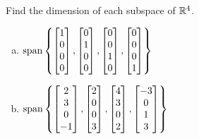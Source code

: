 \begin{applicationActivities}{3}{14}
\begin{activity}{15}
  Find the dimension of each subspace of \(\mathbb{R}^4\).
  \begin{multicols}{3}\small
  \begin{enumerate}[a)]
    \item \(\operatorname{span}\left\{
    \begin{bmatrix}1\\0\\0\\0\end{bmatrix},
    \begin{bmatrix}0\\1\\0\\0\end{bmatrix},
    \begin{bmatrix}0\\0\\1\\0\end{bmatrix},
    \begin{bmatrix}0\\0\\0\\1\end{bmatrix}
    \right\}
    \)

    \item \(\operatorname{span}\left\{
    \begin{bmatrix}2\\3\\0\\-1\end{bmatrix},
    \begin{bmatrix}2\\0\\0\\3\end{bmatrix},
    \begin{bmatrix}4\\3\\0\\2\end{bmatrix},
    \begin{bmatrix}-3\\0\\1\\3\end{bmatrix}
    \right\}
    \)


\end{enumerate}
\end{multicols}
\end{activity}
\end{applicationActivities}
